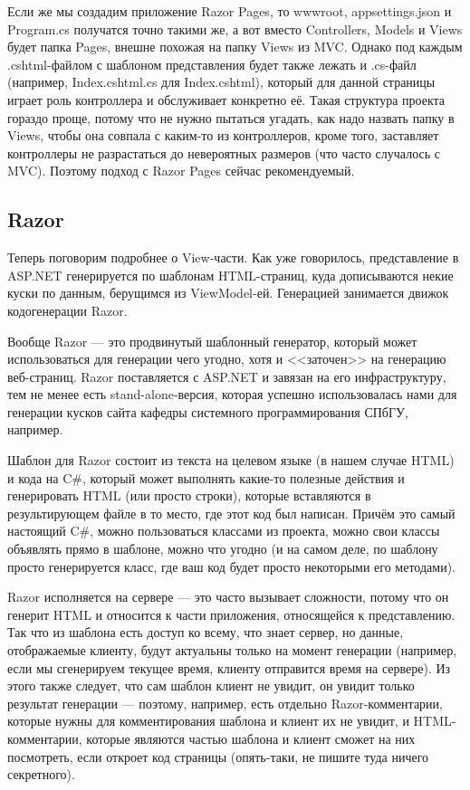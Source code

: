 \documentclass[a5paper]{article}
\begin{document}
Если же мы создадим приложение Razor Pages, то wwwroot, appsettings.json и Program.cs получатся точно такими же, а вот вместо Controllers, Models и Views будет папка Pages, внешне похожая на папку Views из MVC. Однако под каждым .cshtml-файлом с шаблоном представления будет также лежать и .cs-файл (например, Index.cshtml.cs для Index.cshtml), который для данной страницы играет роль контроллера и обслуживает конкретно её. Такая структура проекта гораздо проще, потому что не нужно пытаться угадать, как надо назвать папку в Views, чтобы она совпала с каким-то из контроллеров, кроме того, заставляет контроллеры не разрастаться до невероятных размеров (что часто случалось с MVC). Поэтому подход с Razor Pages сейчас рекомендуемый.

\subsection{Razor}

Теперь поговорим подробнее о View-части. Как уже говорилось, представление в ASP.NET генерируется по шаблонам HTML-страниц, куда дописываются некие куски по данным, берущимся из ViewModel-ей. Генерацией занимается движок кодогенерации Razor.

Вообще Razor --- это продвинутый шаблонный генератор, который может использоваться для генерации чего угодно, хотя и <<заточен>> на генерацию веб-страниц. Razor поставляется с ASP.NET и завязан на его инфраструктуру, тем не менее есть stand-alone-версия, которая успешно использовалась нами для генерации кусков сайта кафедры системного программирования СПбГУ, например.

Шаблон для Razor состоит из текста на целевом языке (в нашем случае HTML) и кода на C\#, который может выполнять какие-то полезные действия и генерировать HTML (или просто строки), которые вставляются в результирующем файле в то место, где этот код был написан. Причём это самый настоящий C\#, можно пользоваться классами из проекта, можно свои классы объявлять прямо в шаблоне, можно что угодно (и на самом деле, по шаблону просто генерируется класс, где ваш код будет просто некоторыми его методами).

Razor исполняется на сервере --- это часто вызывает сложности, потому что он генерит HTML и относится к части приложения, относящейся к представлению. Так что из шаблона есть доступ ко всему, что знает сервер, но данные, отображаемые клиенту, будут актуальны только на момент генерации (например, если мы сгенерируем текущее время, клиенту отправится время на сервере). Из этого также следует, что сам шаблон клиент не увидит, он увидит только результат генерации --- поэтому, например, есть отдельно Razor-комментарии, которые нужны для комментирования шаблона и клиент их не увидит, и HTML-комментарии, которые являются частью шаблона и клиент сможет на них посмотреть, если откроет код страницы (опять-таки, не пишите туда ничего секретного).
\end{document}
